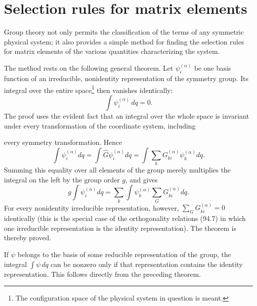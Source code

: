 \section{Selection rules for matrix elements}

Group theory not only permits the classification of the terms of any symmetric physical system; it also provides a simple method for finding the selection rules for matrix elements of the various quantities characterizing the system.

The method rests on the following general theorem. Let $\psi_i^{(\alpha)}$ be one basis function of an irreducible, nonidentity representation of the symmetry group. Its integral over the entire space\footnote{The configuration space of the physical system in question is meant.} then vanishes identically:
\begin{equation}
 \int \psi_i^{(\alpha)}\,dq=0.
 \tag{97.1}
\end{equation}
The proof uses the evident fact that an integral over the whole space is invariant under every transformation of the coordinate system, including

every symmetry transformation. Hence
\[
 \int\psi_i^{(\alpha)}dq=\int\widehat G\psi_i^{(\alpha)}dq
 =\int\sum_k G_{ki}^{(\alpha)}\psi_k^{(\alpha)}dq.
\]
Summing this equality over all elements of the group merely multiplies the integral on the left by the group order $g$, and gives
\[
 g\int\psi_i^{(\alpha)}dq=\sum_k\int\psi_k^{(\alpha)}\sum_G G_{ki}^{(\alpha)}dq.
\]
For every nonidentity irreducible representation, however, $\sum_GG_{ki}^{(\alpha)}=0$ identically (this is the special case of the orthogonality relations (94.7) in which one irreducible representation is the identity representation). The theorem is thereby proved.

If $\psi$ belongs to the basis of some reducible representation of the group, the integral $\int\psi\,dq$ can be nonzero only if that representation contains the identity representation. This follows directly from the preceding theorem.


